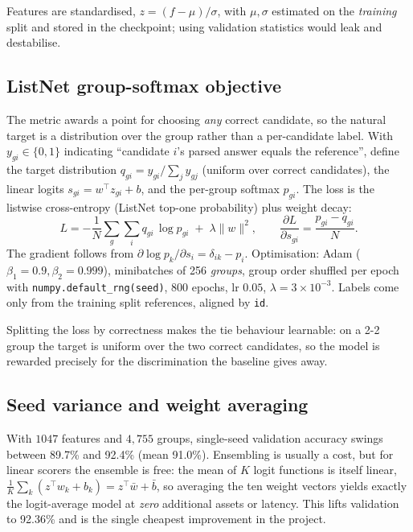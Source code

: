 \documentclass[10pt,a4paper]{article}
\newcommand{\SEEDMIN}{89.7}
\newcommand{\SEEDMAX}{92.4}
\newcommand{\SEEDMEAN}{91.0}
\begin{document}
Features are standardised, $z = (f-\mu)/\sigma$, with $\mu,\sigma$ estimated on
the \emph{training} split and stored in the checkpoint; using validation
statistics would leak and destabilise.

\subsection{ListNet group-softmax objective}
\label{sec:listnet}

The metric awards a point for choosing \emph{any} correct candidate, so the
natural target is a distribution over the group rather than a per-candidate
label. With $y_{gi}\in\{0,1\}$ indicating ``candidate $i$'s parsed answer
equals the reference'', define the target distribution
$q_{gi} = y_{gi}/\sum_j y_{gj}$ (uniform over correct candidates), the linear
logits $s_{gi} = w^\top z_{gi} + b$, and the per-group softmax $p_{gi}$.
The loss is the listwise cross-entropy (ListNet top-one probability) plus
weight decay:
\begin{equation}
L = -\frac{1}{N}\sum_{g}\sum_{i} q_{gi}\,\log p_{gi} \;+\; \lambda \lVert w\rVert^2,
\qquad
\frac{\partial L}{\partial s_{gi}} = \frac{p_{gi}-q_{gi}}{N}.
\label{eq:listnet}
\end{equation}
The gradient follows from $\partial \log p_k/\partial s_i = \delta_{ik}-p_i$.
Optimisation: Adam ($\beta_1{=}0.9,\beta_2{=}0.999$), minibatches of 256
\emph{groups}, group order shuffled per epoch with
\texttt{numpy.default\_rng(seed)}, 800 epochs, lr $0.05$, $\lambda{=}3\times10^{-3}$.
Labels come only from the training split references, aligned by \texttt{id}.

Splitting the loss by correctness makes the tie behaviour learnable: on a 2-2
group the target is uniform over the two correct candidates, so the model is
rewarded precisely for the discrimination the baseline gives away.

\subsection{Seed variance and weight averaging}
\label{sec:seeds}

With $1047$ features and $4{,}755$ groups, single-seed validation accuracy
swings between \SEEDMIN\% and \SEEDMAX\% (mean \SEEDMEAN\%). Ensembling is
usually a cost, but for linear scorers the ensemble is free: the mean of $K$
logit functions is itself linear,
$\frac1K\sum_k (z^\top w_k + b_k) = z^\top \bar w + \bar b$,
so averaging the ten weight vectors yields exactly the logit-average model at
\emph{zero} additional assets or latency. This lifts validation to 92.36\% and
is the single cheapest improvement in the project.
\end{document}
